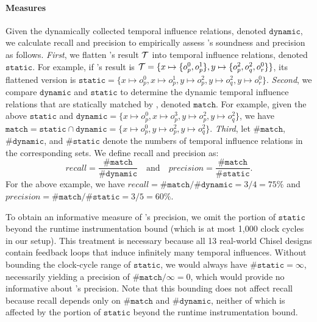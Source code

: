 \paragraph{Measures}
Given the dynamically collected temporal influence relations, denoted $\mathtt{dynamic}$, we calculate recall and precision to empirically assess \tia's soundness and precision as follows.
\emph{First}, we flatten \tia's result $\mathcal{T}$ into temporal influence relations, denoted $\mathtt{static}$.
For example, if \tia's result is $\mathcal{T} = \{x \mapsto \{o_p^0, o_p^1\}, y \mapsto \{o_p^2, o_q^2, o_r^0\}\}$, its flattened version is $\mathtt{static} = \{x \mapsto o_p^0, x \mapsto o_p^1, y \mapsto o_p^2, y \mapsto o_q^2, y \mapsto o_r^0\}$.
\emph{Second}, we compare $\mathtt{dynamic}$ and $\mathtt{static}$ to determine the dynamic temporal influence relations that are statically matched by \tia, denoted $\mathtt{match}$.
For example, given the above $\mathtt{static}$ and $\mathtt{dynamic} = \{x \mapsto o_p^0, x \mapsto o_p^3, y \mapsto o_p^2, y \mapsto o_q^2\}$, we have $\mathtt{match} = \mathtt{static} \cap \mathtt{dynamic} = \{x \mapsto o_p^0, y \mapsto o_p^2, y \mapsto o_q^2 \}$.
\emph{Third}, let $\mathtt{\#match}$, $\mathtt{\#dynamic}$, and $\mathtt{\#static}$ denote the numbers of temporal influence relations in the corresponding sets.
We define recall and precision as:
\begin{equation}\label{eq:recall-precision}
    \mathit{recall} = \frac{\mathtt{\#match}}{\mathtt{\#dynamic}}
    \quad
    \text{and}
    \quad
    \mathit{precision} = \frac{\mathtt{\#match}}{\mathtt{\#static}}.
\end{equation}
For the above example, we have $\mathit{recall} = \mathtt{\#match} / \mathtt{\#dynamic} = 3 / 4 = 75\%$ and $\mathit{precision} = \mathtt{\#match} / \mathtt{\#static} = 3 / 5 = 60\%$.

To obtain an informative measure of \tia's precision, we omit the portion of $\mathtt{static}$ beyond the runtime instrumentation bound (which is at most 1,000 clock cycles in our setup).
This treatment is necessary because all 13 real-world Chisel designs contain feedback loops that induce infinitely many temporal influences.
Without bounding the clock-cycle range of $\mathtt{static}$, we would always have $\mathtt{\#static} = \infty$, necessarily yielding a precision of $\mathtt{\#match}/\infty = 0$, which would provide no informative about \tia's precision.
Note that this bounding does not affect recall because recall depends only on $\mathtt{\#match}$ and $\mathtt{\#dynamic}$, neither of which is affected by the portion of $\mathtt{static}$ beyond the runtime instrumentation bound.

